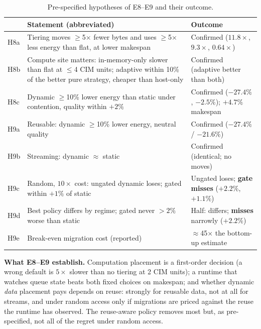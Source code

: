 \begin{table}[t]
\centering\small
\caption{Pre-specified hypotheses of E8--E9 and their outcome.}
\label{tab:score}
\begin{tabular}{>{\raggedright\arraybackslash}p{1.0cm}>{\raggedright\arraybackslash}p{10.2cm}>{\raggedright\arraybackslash}p{3.8cm}}
\toprule
 & Statement (abbreviated) & Outcome\\
\midrule
H8a & Tiering moves $\ge$5$\times$ fewer bytes and uses $\ge$5$\times$ less energy than flat, at lower makespan & Confirmed ($11.8\times$, $9.3\times$, $0.64\times$)\\
H8b & Compute site matters: in-memory-only slower than flat at $\le$4 CIM units; adaptive within 10\% of the better pure strategy, cheaper than host-only & Confirmed (adaptive better than both)\\
H8c & Dynamic $\ge$10\% lower energy than static under contention, quality within $+2\%$ & Confirmed ($-27.4\%$, $-2.5\%$); $+4.7\%$ makespan\\
H9a & Reusable: dynamic $\ge$10\% lower energy, neutral quality & Confirmed ($-27.4\%$ / $-21.6\%$)\\
H9b & Streaming: dynamic $\approx$ static & Confirmed (identical; no moves)\\
H9c & Random, $10\times$ cost: ungated dynamic loses; gated within $+1\%$ of static & Ungated loses; \textbf{gate misses} ($+2.2\%$, $+1.1\%$)\\
H9d & Best policy differs by regime; gated never $>2\%$ worse than static & Half: differs; \textbf{misses} narrowly ($+2.2\%$)\\
H9e & Break-even migration cost (reported) & $\approx$45$\times$ the bottom-up estimate\\
\bottomrule
\end{tabular}
\end{table}

\textbf{What E8--E9 establish.} Computation placement is a first-order decision (a wrong default is $5\times$ slower than no tiering at 2 CIM units); a runtime that watches queue state beats both fixed choices on makespan; and whether dynamic \emph{data} placement pays depends on reuse: strongly for reusable data, not at all for streams, and under random access only if migrations are priced against the reuse the runtime has observed. The reuse-aware policy removes most but, as pre-specified, not all of the regret under random access.
